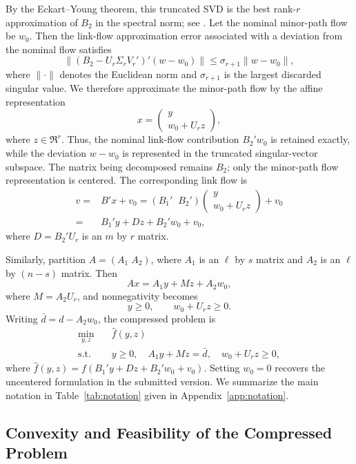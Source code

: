\documentclass[11pt]{article}
\begin{document}
{\color{red}
By the Eckart--Young theorem, this truncated SVD is the best rank-$r$ approximation of $B_2$ in the spectral norm; see \cite[Theorem~2.4.8]{golub2013matrix}. Let the nominal minor-path flow be $w_0$. Then the link-flow approximation error associated with a deviation from the nominal flow satisfies
$$\big\|(B_2-U_r\Sigma_rV_r')'(w-w_0)\big\|\leq \sigma_{r+1}\|w-w_0\|,$$
where $\|\cdot\|$ denotes the Euclidean norm and $\sigma_{r+1}$ is the largest discarded singular value. We therefore approximate the minor-path flow by the affine representation
$$x=\begin{pmatrix}
    y\\
    w_0+U_rz
\end{pmatrix},$$
where $z\in\Re^r$. Thus, the nominal link-flow contribution $B_2'w_0$ is retained exactly, while the deviation $w-w_0$ is represented in the truncated singular-vector subspace. The matrix being decomposed remains $B_2$; only the minor-path flow representation is centered. The corresponding link flow is
\begin{align*}
    v=&B'x+v_0=(B_1'\;\;B_2')\begin{pmatrix}
    y\\
    w_0+U_rz
\end{pmatrix}+v_0\\
=&B_1'y+Dz+B_2'w_0+v_0,
\end{align*}
where $D=B_2'U_r$ is an $m$ by $r$ matrix.

Similarly, partition $A=(A_1\;A_2)$, where $A_1$ is an $\ell$ by $s$ matrix and $A_2$ is an $\ell$ by $(n-s)$ matrix. Then
$$Ax=A_1y+Mz+A_2w_0,$$
where $M=A_2U_r$, and nonnegativity becomes
$$y\geq0,\qquad w_0+U_rz\geq0.$$
Writing $\bar d=d-A_2w_0$, the compressed problem is
\begin{equation}
    \label{eq:compressed_ta}
    \begin{aligned}
        \min_{y,z}\quad & \hat f(y,z)\\
    \text{s.t.}\quad & y\geq0,\quad A_1y+Mz=\bar d,\quad w_0+U_rz\geq0,
    \end{aligned}
\end{equation}
where $\hat f(y,z)=f(B_1'y+Dz+B_2'w_0+v_0)$. Setting $w_0=0$ recovers the uncentered formulation in the submitted version. We summarize the main notation in Table~\ref{tab:notation} given in Appendix~\ref{app:notation}.
}




\subsection{Convexity and Feasibility of the Compressed Problem}\label{sec:convex_feasible}
\end{document}
